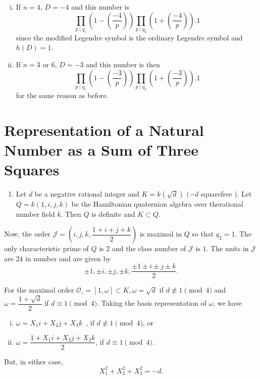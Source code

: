 \begin{enumerate}[i)]
\item If  $ n = 4 $, $ D = -4 $ and this number is 
  $$
  \prod_{p \mid q_1} \left( 1 - \left( \frac{-4}{p}\right)\right)
  \prod_{p \mid q_2} \left(1 + \left( \frac{-4}{p} \right)\right).  1  
  $$
  since the modified Legendre symbol is the ordinary Legendre symbol
  and $ h (D) = 1 $. 
\item If  $ n = 3 $ or $6$, $D = -3 $ and this number is then 
  $$
  \prod_{p \mid q_1} \left( 1 - \left( \frac{-3}{p}\right)\right)
  \prod_{p \mid q_2} \left(1 + \left( \frac{-3}{p} \right)\right).  1 
  $$
  for the same reason as before.
\end{enumerate}

\section*{Representation of a Natural Number as a Sum of Three Squares}

\begin{enumerate}
\renewcommand{\labelenumi}{\bf\theenumi.}
\setcounter{enumi}{5}
\item Let $d$ be a negative rational integer and $ K= k ( \sqrt{d} ) $
  $ ( -d $ squarefree ). Let $ Q = k ( 1, i, j, k ) $ be the
  Hamiltonian quaternion algebra over the\pageoriginale rational number field
  $k$. Then $Q$ is definite and $K \subset Q$. 
\end{enumerate}

Now, the order $\mathcal{J} = (i, j, k, \dfrac{1+i+j+k}{2})$ is
maximal in $Q$ so that $q_2 = 1$. The only characteristic prime of $Q$
is $2$ and the class number of $\mathcal{J}$ is $1$. The units in
$\mathcal{J}$ are $24$ in number and are given by  
$$
\pm 1, \pm i, \pm j, \pm k, \frac{\pm 1 \pm i \pm j \pm k}{2}. 
$$

For the maximal order $\mathscr{O}_\circ = [ 1, \omega] \subset K, \omega =
\sqrt{d}$ if $d \not \equiv 1 \pmod 4$ and $ \omega =
\dfrac{1+\sqrt{d}}{2}$ if $d \equiv 1 \pmod 4$. Taking the basis
representation of $\omega$, we have 
\begin{enumerate}[i)]
\item $\omega = X_1 i + X_2 j + X_3 k$~,  if $d \not \equiv 1 \pmod 4$, or
\item $\omega = \dfrac{1+X_1 i + X_2 j + X_3 k}{2}$, if $d \equiv 1 \pmod 4$.
\end{enumerate}

But, in either case,
$$
X^2_1 +X^2_2 +X^2_3 = -d.
$$


